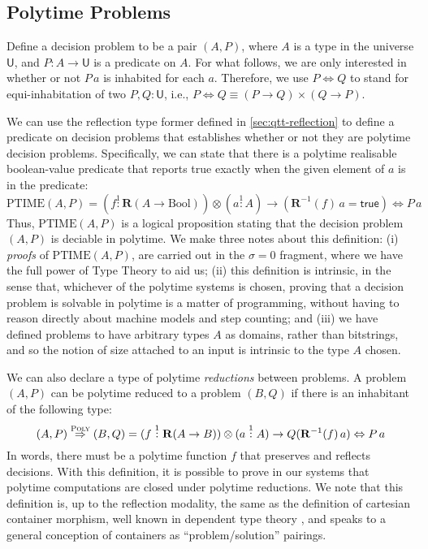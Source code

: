 \documentclass[acmsmall,screen]{acmart}
\newcommand{\BoolTy}{\mathrm{Bool}}
\newcommand{\cTrue}{\mathsf{true}}
\begin{document}
\subsection{Polytime Problems}
\label{sec:polytime-problems}

Define a decision problem to be a pair $(A, P)$, where $A$ is a type
in the universe $\mathsf{U}$, and $P : A \to \mathsf{U}$ is a
predicate on $A$. For what follows, we are only interested in whether
or not $P\,a$ is inhabited for each $a$. Therefore, we use
$P \Leftrightarrow Q$ to stand for equi-inhabitation of two
$P, Q : \mathsf{U}$, i.e.,
$P \Leftrightarrow Q \equiv (P \to Q) \times (Q \to P)$.

We can use the reflection type former defined in
\autoref{sec:qtt-reflection} to define a predicate on decision
problems that establishes whether or not they are polytime decision
problems. Specifically, we can state that there is a polytime
realisable boolean-value predicate that reports true exactly when the
given element of $a$ is in the predicate:
\begin{displaymath}
  \mathrm{PTIME}(A,P) =
    (f \stackrel1: \mathbf{R}(A \to \BoolTy)) \otimes (a \stackrel1: A) \to (\mathbf{R}^{-1}(f)\, a = \cTrue) \Leftrightarrow P\,a
\end{displaymath}
Thus, $\mathrm{PTIME}(A,P)$ is a logical proposition stating that the
decision problem $(A,P)$ is deciable in polytime. We make three notes
about this definition: (i) \emph{proofs} of $\mathrm{PTIME}(A,P)$, are
carried out in the $\sigma = 0$ fragment, where we have the full power
of Type Theory to aid us; (ii) this definition is intrinsic, in the
sense that, whichever of the polytime systems is chosen, proving that
a decision problem is solvable in polytime is a matter of programming,
without having to reason directly about machine models and step
counting; and (iii) we have defined problems to have arbitrary types
$A$ as domains, rather than bitstrings, and so the notion of size
attached to an input is intrinsic to the type $A$ chosen.

We can also declare a type of polytime \emph{reductions} between
problems. A problem $(A, P)$ can be polytime reduced to a problem
$(B,Q)$ if there is an inhabitant of the following type:
\begin{displaymath}
  (A,P) \stackrel{\textsc{Poly}}\Rightarrow (B,Q) = (f \stackrel1: \mathbf{R}(A \to B)) \otimes (a \stackrel1: A) \to Q(\mathbf{R}^{-1}(f)\,a) \Leftrightarrow P\,a
\end{displaymath}
In words, there must be a polytime function $f$ that preserves and
reflects decisions. With this definition, it is possible to prove in
our systems that polytime computations are closed under polytime
reductions. We note that this definition is, up to the reflection
modality, the same as the definition of cartesian container morphism,
well known in dependent type theory \cite{AbbottAG05}, and speaks to a
general conception of containers as ``problem/solution'' pairings.
\end{document}
